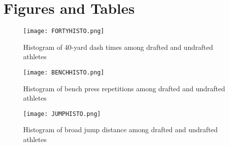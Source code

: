 \documentclass[12pt,english]{article}
\begin{document}
\vfill
\pagebreak{}
\clearpage

\section{Figures and Tables}\label{sec:figures and tables}

\begin{figure}[ht]
    \centering
    \bigskip{}
    \texttt{[image: FORTYHISTO.png]}
    \caption{Histogram of 40-yard dash times among drafted and undrafted athletes}
    \label{fig:my_label}
\end{figure}

\begin{figure}[ht]
    \centering
    \bigskip{}
    \texttt{[image: BENCHHISTO.png]}
    \caption{Histogram of bench press repetitions among drafted and undrafted athletes}
    \label{fig:my_label}
\end{figure}

\begin{figure}[ht]
    \centering
    \bigskip{}
    \texttt{[image: JUMPHISTO.png]}
    \caption{Histogram of broad jump distance among drafted and undrafted athletes}
    \label{fig:my_label}
\end{figure}
\end{document}
